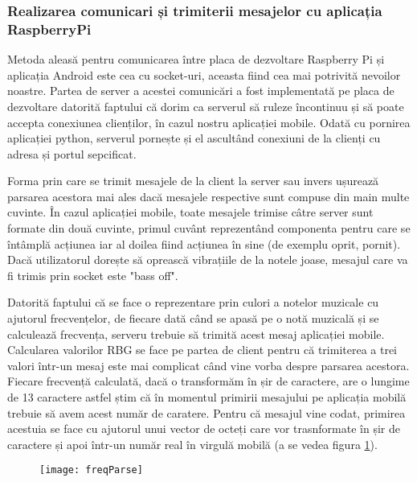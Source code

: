 \documentclass[../IoMusT.tex]{subfiles}
\begin{document}
\subsubsection{Realizarea comunicari și trimiterii mesajelor cu aplicația RaspberryPi}
Metoda aleasă pentru comunicarea între placa de dezvoltare Raspberry Pi și aplicația Android este cea cu socket-uri, aceasta fiind cea mai potrivită nevoilor noastre. Partea de server a acestei comunicări a fost implementată pe placa de dezvoltare datorită faptului că dorim ca serverul să ruleze încontinuu și să poate accepta conexiunea clienților, în cazul nostru aplicației mobile. Odată cu pornirea aplicației python, serverul pornește și el ascultând conexiuni de la clienți cu adresa și portul sepcificat.
\\
\par Forma prin care se trimit mesajele de la client la server sau invers ușurează parsarea acestora mai ales dacă mesajele respective sunt compuse din main multe cuvinte. În cazul aplicației mobile, toate mesajele trimise câtre server sunt formate din două cuvinte, primul cuvânt reprezentând componenta pentru care se întâmplă acțiunea iar al doilea fiind acțiunea în sine (de exemplu oprit, pornit). Dacă utilizatorul dorește să oprească vibrațiile de la notele joase, mesajul care va fi trimis prin socket este "bass off". 
\\
\par Datorită faptului că se face o reprezentare prin culori a notelor muzicale cu ajutorul frecvențelor, de fiecare dată când se apasă pe o notă muzicală și se calculează frecvența, serveru trebuie să trimită acest mesaj aplicației mobile. Calcularea valorilor RBG se face pe partea de client pentru că trimiterea a trei valori într-un mesaj este mai complicat când vine vorba despre parsarea acestora. Fiecare frecvență calculată, dacă o transformăm în șir de caractere, are o lungime de 13 caractere astfel știm că în momentul primirii mesajului pe aplicația mobilă trebuie să avem acest număr de caratere. Pentru că mesajul vine codat, primirea acestuia se face cu ajutorul unui vector de octeți care vor trasnformate în șir de caractere și apoi într-un număr real în virgulă mobilă (a se vedea figura \ref{fig:freqParse}).
\begin{figure}[h]
\centering
\texttt{[image: freqParse]}
\caption{}
\label{fig:freqParse}
\end{figure} 
\end{document}
